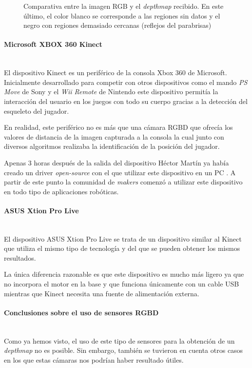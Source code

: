 \begin{figure}[h!]
    \caption[Comparativa entre la imagen RGB y el \textit{depthmap} recibido]{Comparativa entre la imagen RGB y el \textit{depthmap} recibido. En este último, el color blanco se corresponde a las regiones sin datos y el negro con regiones demasiado cercanas (reflejos del parabrisas)}
    \label{fig:comparativaDephmapRGB}
\end{figure}

\paragraph{Microsoft XBOX 360 Kinect}\mbox{}\\

El dispositivo Kinect es un periférico de la consola Xbox 360 de Microsoft. Inicialmente desarrollado para competir con otros dispositivos como el mando \textit{PS Move} de Sony y el \textit{Wii Remote} de Nintendo este dispositivo permitía la interacción del usuario en los juegos con todo su cuerpo gracias a la detección del esqueleto del jugador.

En realidad, este periférico no es más que una cámara RGBD que ofrecía los valores de distancia de la imagen capturada a la consola la cual junto con diversos algoritmos realizaba la identificación de la posición del jugador.

Apenas 3 horas después de la salida del dispositivo Héctor Martín ya había creado un driver \textit{open-source} con el que utilizar este dispositivo en un PC \cite{marcan42kinect}. A partir de este punto la comunidad de \textit{makers} comenzó a utilizar este dispositivo en todo tipo de aplicaciones robóticas.


\paragraph{ASUS Xtion Pro Live}\mbox{}\\

El dispositivo ASUS Xtion Pro Live se trata de un dispositivo similar al Kinect que utiliza el mismo tipo de tecnología y del que se pueden obtener los mismos resultados. 

La única diferencia razonable es que este dispositivo es mucho más ligero ya que no incorpora el motor en la base y que funciona únicamente con un cable USB mientras que Kinect necesita una fuente de alimentación externa.

\paragraph{Conclusiones sobre el uso de sensores RGBD}\mbox{}\\
Como ya hemos visto, el uso de este tipo de sensores para la obtención de un \textit{depthmap} no es posible. Sin embargo, también se tuvieron en cuenta otros casos en los que estas cámaras nos podrían haber resultado útiles. 

